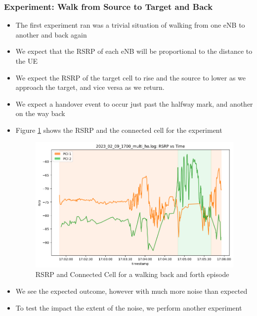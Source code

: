 \subsubsection{Experiment: Walk from Source to Target and Back}
\begin{itemize}
    \item The first experiment ran was a trivial situation of walking from one eNB to another and back again
    \item We expect that the RSRP of each eNB will be proportional to the distance to the UE
    \item We expect the RSRP of the target cell to rise and the source to lower as we approach the target, and vice versa as we return. 
    \item We expect a handover event to occur just past the halfway mark, and another on the way back
    \item Figure \ref{fig:methods:2024-02-09-multi-ho} shows the RSRP and the connected cell for the experiment
\begin{figure}
    \centering
    \includegraphics[width=0.75\linewidth]{src//img/2024_02_09_multiho.png}
    \caption{RSRP and Connected Cell for a walking back and forth episode}
    \label{fig:methods:2024-02-09-multi-ho}
\end{figure}

\item We see the expected outcome, however with much more noise than expected
\item To test the impact the extent of the noise, we perform another experiment
\end{itemize}

